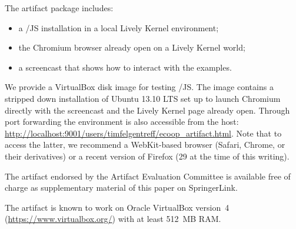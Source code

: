 \begin{content}
  The artifact package includes:
  \begin{itemize}
  \item a \langname/JS installation in a local Lively Kernel environment;
  \item the Chromium browser already open on a Lively Kernel world;
  \item a screencast that shows how to interact with the examples.
  \end{itemize}
  We provide a VirtualBox disk image for testing \langname/JS\@. The
  image contains a stripped down installation of Ubuntu 13.10 LTS set
  up to launch Chromium directly with the screencast and the Lively
  Kernel page already open. Through port forwarding the environment is
  also accessible from the host:
  \url{http://localhost:9001/users/timfelgentreff/ecoop_artifact.html}. Note
  that to access the latter, we recommend a WebKit-based browser
  (Safari, Chrome, or their derivatives) or a recent version of
  Firefox (29 at the time of this writing).
\end{content} 

\begin{getting}
  The artifact endorsed by the Artifact Evaluation Committee is
  available free of charge as supplementary material of this paper on
  SpringerLink.
\end{getting} 

\begin{platforms}
  The artifact is known to work on Oracle VirtualBox version~4
  (\url{https://www.virtualbox.org/}) with at least 512~MB RAM.
\end{platforms}



